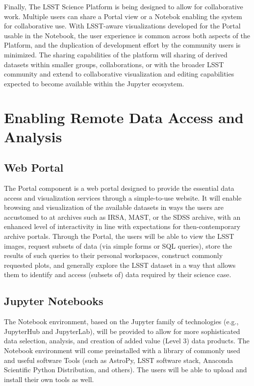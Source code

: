 \documentclass[DM,lsstdraft,toc]{lsstdoc}
\begin{document}
Finally, The LSST Science Platform is being designed to allow for collaborative 
work. Multiple users can share a Portal view or a Notebok enabling the system 
for collaborative use.  With LSST-aware visualizations developed for the Portal 
usable in the Notebook, the user experience is common across both aspects of the 
Platform, and the duplication of development effort by the community users is 
minimized.   The sharing capabilities of the platform will sharing of derived 
datasets within smaller groups, collaborations, or with the broader LSST 
community and extend to collaborative visualization and editing capabilities 
expected to become available within the Jupyter ecosystem.

\section{Enabling Remote Data Access and Analysis}

\subsection{Web Portal}
The Portal component is a web portal designed to provide the essential data 
access and visualization services through a simple-to-use website.  It will 
enable browsing and visualization of the available datasets in ways the users 
are accustomed to at archives such as IRSA, MAST, or the SDSS archive, with an 
enhanced level of interactivity in line with expectations for then-contemporary 
archive portals.  Through the Portal, the users will be able to view the LSST 
images, request subsets of data (via simple forms or SQL queries), store the 
results of such queries to their personal workspaces, construct commonly 
requested plots, and generally explore the LSST dataset in a way that allows 
them to identify and access (subsets of) data required by their science case.

\subsection{Jupyter Notebooks}
The Notebook environment, based on the Jupyter family of technologies (e.g., 
JupyterHub and JupyterLab), will be provided to allow for more sophisticated 
data selection, analysis, and creation of added value (Level 3) data products.  
The Notebook environment will come preinstalled with a library of commonly used 
and useful software Tools (such as AstroPy, LSST software stack, Anaconda 
Scientific Python Distribution, and others).  The users will be able to upload 
and install their own tools as well.
\end{document}
